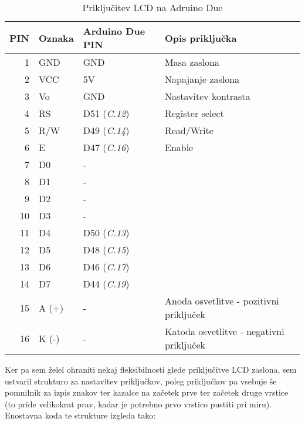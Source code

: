 \documentclass[12pt,a4paper,twoside,openright,slovene]{book}
\begin{document}
\begin{footnotesize}
	\begin{center}
        \begin{longtable}{rl|l|l}
            \caption{Priključitev LCD na Adruino Due} \\
            PIN & Oznaka & Arduino Due PIN & Opis priključka\\ \hline \hline
            1   & GND           & GND & Masa zaslona \\
            2   & VCC           & 5V  & Napajanje zaslona \\
            3   & V\small{o}    & GND & Nastavitev kontrasta \\
            4   & RS            & D51 (\textit{C.12}) & Register select \\
            5   & R/W           & D49 (\textit{C.14}) & Read/Write \\
            6   & E             & D47 (\textit{C.16}) & Enable \\
            7   & D0            & - & \\
            8   & D1            & - & \\
            9   & D2            & - & \\
            10  & D3            & - & \\
            11  & D4            & D50 (\textit{C.13}) & \\
            12  & D5            & D48 (\textit{C.15}) & \\
            13  & D6            & D46 (\textit{C.17}) & \\
            14  & D7            & D44 (\textit{C.19}) & \\
            15  & A (+)         & - & Anoda osvetlitve - pozitivni priključek\\
            16  & K (-)         & - & Katoda osvetlitve - negativni priključek\\
        \end{longtable}
	\end{center}
\end{footnotesize}

Ker pa sem želel ohraniti nekaj fleksibilnosti glede priključitve LCD zaslona, sem ustvaril strukturo za nastavitev priključkov, poleg priključkov pa vsebuje še pomnilnik za izpis znakov ter kazalce na začetek prve ter začetek druge vrstice (to pride velikokrat prav, kadar je potrebno prvo vrstico pustiti pri miru). Enostavna koda te strukture izgleda tako:
\end{document}
